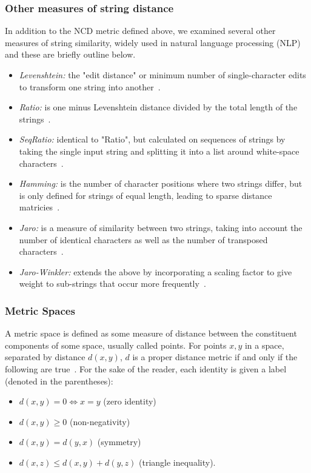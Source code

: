 \documentclass[conference]{IEEEtran}
\begin{document}
\subsubsection{Other measures of string distance}
\label{string_metrics}
In addition to the NCD metric defined above, we examined several other measures of string similarity, widely used in natural language processing (NLP) and these are briefly outline below.
\begin{itemize}
    \item \textit{Levenshtein:} the "edit distance" or minimum number of single-character edits to transform one string into another~\cite{navarro2001guided}.
    \item \textit{Ratio:} is one minus Levenshtein distance divided by the total length of the strings~\cite{levenshtein}.
    \item \textit{SeqRatio:} identical to "Ratio", but calculated on sequences of strings by taking the single input string and splitting it into a list around white-space characters~\cite{levenshtein}.
    \item \textit{Hamming:} is the number of character positions where two strings differ, but is only defined for strings of equal length, leading to sparse distance matricies~\cite{hamming_distance}.
    \item \textit{Jaro:} is a measure of similarity between two strings, taking into account the number of identical characters as well as the number of transposed characters~\cite{jaro}.
    \item \textit{Jaro-Winkler:} extends the above by incorporating a scaling factor to give weight to sub-strings that occur more frequently~\cite{jaro}. 
\end{itemize}



\subsubsection{Metric Spaces}

A metric space is defined as some measure of distance between the constituent components of some space, usually called points.  For points $x,y$ in a space, separated by distance $d(x,y)$, $d$ is a proper distance metric if and only if the following are true~\cite{metrics}. For the sake of the reader, each identity is given a label (denoted in the parentheses):

\label{metric_spaces}
\begin{itemize}
    \item $d(x, y) = 0 \iff x = y$ (zero identity)
    \item $d(x, y) \geq 0$ (non-negativity)
    \item $d(x, y) = d(y, x)$ (symmetry)
    \item $d(x, z) \leq d(x, y) + d(y, z)$ (triangle inequality).
\end{itemize}
\end{document}
